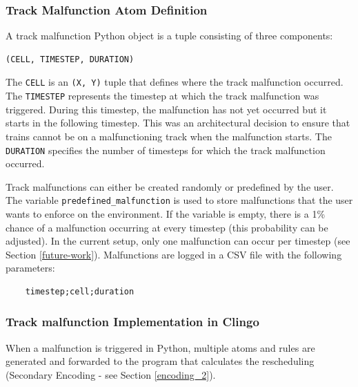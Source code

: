 \documentclass[runningheads]{llncs}
\begin{document}
\subsubsection{Track Malfunction Atom Definition}

A track malfunction Python object is a tuple consisting of three components:

\begin{verbatim}
(CELL, TIMESTEP, DURATION)
\end{verbatim}

The \texttt{CELL} is an \texttt{(X, Y)} tuple that defines where the track malfunction occurred.
The \texttt{TIMESTEP} represents the timestep at which the track malfunction was triggered. During this timestep, the malfunction has not yet occurred but it starts in the following timestep. This was an architectural decision to ensure that trains cannot be on a malfunctioning track when the malfunction starts.
The \texttt{DURATION} specifies the number of timesteps for which the track malfunction occurred.

Track malfunctions can either be created randomly or predefined by the user. The variable \texttt{predefined\_malfunction} is used to store malfunctions that the user wants to enforce on the environment. If the variable is empty, there is a 1\% chance of a malfunction occurring at every timestep (this probability can be adjusted). In the current setup, only one malfunction can occur per timestep (see Section \ref{future-work}). Malfunctions are logged in a CSV file with the following parameters:

\begin{verbatim}
	timestep;cell;duration
\end{verbatim}

\subsubsection{Track malfunction Implementation in Clingo}\label{fwd_info_2_clingo}

When a malfunction is triggered in Python, multiple atoms and rules are generated and forwarded to the program that calculates the rescheduling (Secondary Encoding - see Section \ref{encoding_2}).
\end{document}
